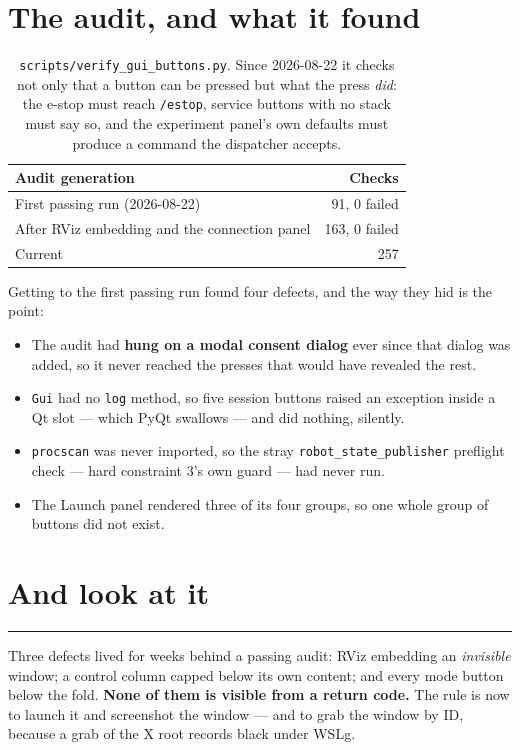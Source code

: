 \documentclass[11pt,a4paper,oneside]{report}
\newcommand{\code}[1]{\texttt{\small #1}}
\newcommand{\file}[1]{\texttt{\small #1}}
\newcommand{\keyfact}[1]{%
  \par\vspace{7pt}\noindent
  \hspace*{0pt}\textcolor{srlblue}{\rule{2.5pt}{\dimexpr\baselineskip\relax}}%
  \hspace{9pt}%
  \begin{minipage}[t]{\dimexpr\textwidth-14pt\relax}
  \small #1
  \end{minipage}\par\vspace{7pt}}
\begin{document}
\section{The audit, and what it found}

\begin{table}[H]
\centering
\small
\begin{tabular}{@{}lr@{}}
\toprule
\textbf{Audit generation} & \textbf{Checks} \\
\midrule
First passing run (2026-08-22) & 91, 0 failed \\
After RViz embedding and the connection panel & 163, 0 failed \\
Current & 257 \\
\bottomrule
\end{tabular}
\caption{\file{scripts/verify\_gui\_buttons.py}. Since 2026-08-22 it checks not
only that a button can be pressed but what the press \emph{did}: the e-stop
must reach \code{/estop}, service buttons with no stack must say so, and the
experiment panel's own defaults must produce a command the dispatcher accepts.}
\end{table}

Getting to the first passing run found four defects, and the way they hid is
the point:

\begin{itemize}
\item The audit had \textbf{hung on a modal consent dialog} ever since that
      dialog was added, so it never reached the presses that would have
      revealed the rest.
\item \code{Gui} had no \code{log} method, so five session buttons raised an
      exception inside a Qt slot --- which PyQt swallows --- and did nothing,
      silently.
\item \code{procscan} was never imported, so the stray
      \code{robot\_state\_publisher} preflight check --- hard constraint 3's own
      guard --- had never run.
\item The Launch panel rendered three of its four groups, so one whole group of
      buttons did not exist.
\end{itemize}

\section{And look at it}

\keyfact{Three defects lived for weeks behind a passing audit: RViz embedding an
\emph{invisible} window; a control column capped below its own content; and
every mode button below the fold. \textbf{None of them is visible from a return
code.} The rule is now to launch it and screenshot the window --- and to grab
the window by ID, because a grab of the X root records black under WSLg.}
\end{document}
